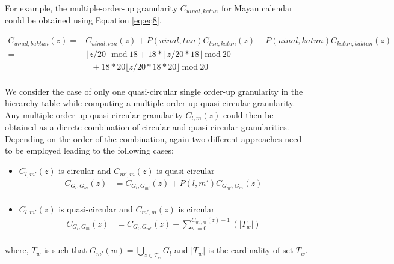 \documentclass[12pt]{article}
\begin{document}
\noindent For example, the multiple-order-up granularity \(C_{uinal,katun}\) for Mayan calendar could be obtained using Equation \ref{eq:eq8}.

\begin{equation} \label{eq:eq8}
\begin{split}
C_{uinal, baktun}(z)  = & C_{uinal, tun}(z) + P(uinal, tun)C_{tun,katun}(z) + P(uinal, katun)C_{katun, baktun}(z) \\
               = & \lfloor z/20\rfloor ~\text{mod}~18 + 18*\lfloor z/20*18\rfloor ~\text{mod}~20  \\
               &~~~ + 18*20\lfloor z/20*18*20\rfloor ~\text{mod}~20 \\
\end{split}
\end{equation}

\noindent We consider the case of only one quasi-circular single order-up granularity in the hierarchy table while computing a multiple-order-up quasi-circular granularity. Any multiple-order-up quasi-circular granularity \(C_{l, m}(z)\) could then be obtained as a dicrete combination of circular and quasi-circular granularities.
 Depending on the order of the combination, again two different approaches need to be employed leading to the following cases:

\begin{itemize}
\item
  \(C_{l,m'}(z)\) is circular and \(C_{m',m}(z)\) is quasi-circular
  \begin{equation} \label{eq:multifromsingle-quasi1}
  \begin{split}
  C_{G_l,G_{m}}(z) & = C_{G_{l},G_{m'}}(z) + P(l, m')C_{G_{m'},G_{m}}(z) \\
  \end{split}
  \end{equation}
\item
  \(C_{l,m'}(z)\) is quasi-circular and \(C_{m',m}(z)\) is circular
  \begin{equation} \label{eq:multifromsingle-quasi2}
  \begin{split}
  C_{G_l,G_{m}}(z) & = C_{G_{l},G_{m'}}(z) + \sum_{w=0}^{C_{m',m}(z) -1}(\vert T_{w} \vert)\\
  \end{split}
  \end{equation}
\end{itemize}

\noindent where, \(T_w\) is such that \(G_{m'}(w) = \bigcup_{z \in T_w}G_{l}\) and \(\vert T_w \vert\) is the cardinality of set \(T_w\).
\end{document}
